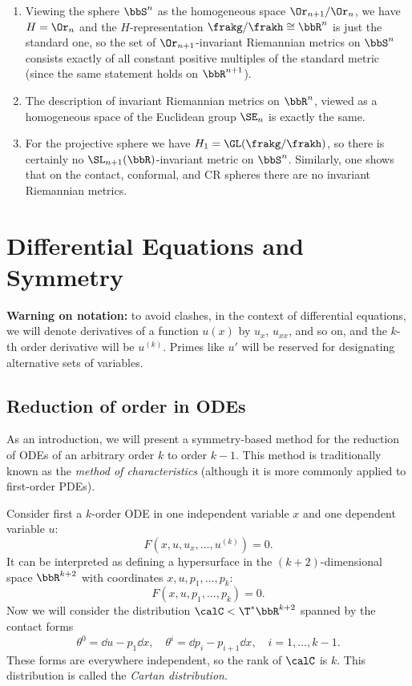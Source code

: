 \begin{example}
    \begin{enumerate}
        \item Viewing the sphere $\bbS^n$ as the homogeneous space $\Or_{n+1}\slash \Or_n$, we have $H=\Or_n$ and the $H$-representation $\frakg\slash\frakh\cong\bbR^n$ is just the standard one, so the set of $\Or_{n+1}$-invariant Riemannian metrics on $\bbS^n$ consists exactly of all constant positive multiples of the standard metric (since the same statement holds on $\bbR^{n+1}$).
        \item The description of invariant Riemannian metrics on $\bbR^n$, viewed as a homogeneous space of the Euclidean group $\SE_n$ is exactly the same. 
        \item For the projective sphere we have $H_1=\GL(\frakg\slash\frakh)$, so there is certainly no $\SL_{n+1}(\bbR)$-invariant metric on $\bbS^n$. Similarly, one shows that on the contact, conformal, and CR spheres there are no invariant Riemannian metrics.
    \end{enumerate}
\end{example}









\chapter{Differential Equations and Symmetry \texorpdfstring{\ucmark}{}}


\textbf{Warning on notation:} to avoid clashes, in the context of differential equations, we will denote derivatives of a function $u(x)$ by $u_x$, $u_{xx}$, and so on, and the $k$-th order derivative will be $u^{(k)}$. Primes like $u'$ will be reserved for designating alternative sets of variables.




\section{Reduction of order in ODEs}


As an introduction, we will present a symmetry-based method for the reduction of ODEs of an arbitrary order $k$ to order $k-1$. This method is traditionally known as the \emph{method of characteristics} (although it is more commonly applied to first-order PDEs).

Consider first a $k$-order ODE in one independent variable $x$ and one dependent variable $u$:
\[F\left(x,u,u_x,\ldots,u^{(k)}\right)=0.\]
It can be interpreted as defining a hypersurface in the $(k+2)$-dimensional space $\bbR^{k+2}$ with coordinates $x,u,p_1,\ldots,p_k$:
\[F(x,u,p_1,\ldots,p_k)=0.\]
Now we will consider the distribution $\calC<\T^\ast \bbR^{k+2}$ spanned by the contact forms 
\[\theta^0=\dd u-p_1\dd x,\quad \theta^i=\dd p_i-p_{i+1}\dd x,\quad i=1,\ldots,k-1.\]
These forms are everywhere independent, so the rank of $\calC$ is $k$. This distribution is called the \emph{Cartan distribution}.

